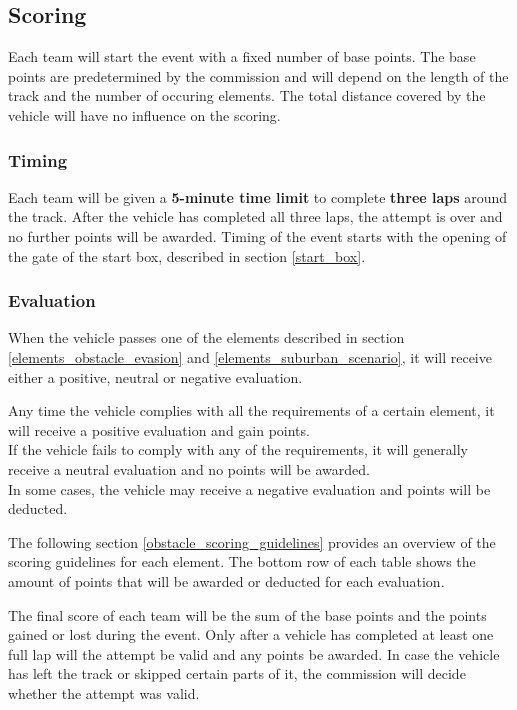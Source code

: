 {
\renewcommand*\footnoterule{} %
\newcommand{\topstrut}{\rule{0pt}{3.5ex}}

\subsection{Scoring}
Each team will start the event with a fixed number of base points. The base
points are predetermined by the commission and will depend on the length of the
track and the number of occuring elements. The total distance covered by the
vehicle will have no influence on the scoring.

\subsubsection{Timing}
Each team will be given a \textbf{5-minute time limit} to complete
\textbf{three laps} around the track. After the vehicle has completed all three
laps, the attempt is over and no further points will be awarded. Timing of the
event starts with the opening of the gate of the start box, described in
section \ref{start_box}.

\subsubsection{Evaluation}
When the vehicle passes one of the elements described in section
\ref{elements_obstacle_evasion} and \ref{elements_suburban_scenario}, it will
receive either a positive, neutral or negative evaluation.

Any time the vehicle complies with all the requirements of a certain element,
it will receive a positive evaluation and gain points.\\ If the vehicle fails
to comply with any of the requirements, it will generally receive a neutral
evaluation and no points will be awarded.\\ In some cases, the vehicle may
receive a negative evaluation and points will be deducted.

The following section \ref{obstacle_scoring_guidelines} provides an overview of
the scoring guidelines for each element. The bottom row of each table shows the
amount of points that will be awarded or deducted for each evaluation.

The final score of each team will be the sum of the base points and the points
gained or lost during the event. Only after a vehicle has completed at least
one full lap will the attempt be valid and any points be awarded. In case the
vehicle has left the track or skipped certain parts of it, the commission will
decide whether the attempt was valid.

}
